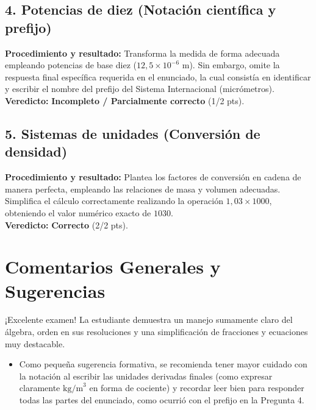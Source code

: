 \documentclass[12pt]{article}
\begin{document}
\subsection*{4. Potencias de diez (Notación científica y prefijo)}
\textbf{Procedimiento y resultado:} Transforma la medida de forma adecuada empleando potencias de base diez ($12,5 \times 10^{-6}$ m). Sin embargo, omite la respuesta final específica requerida en el enunciado, la cual consistía en identificar y escribir el nombre del prefijo del Sistema Internacional (micrómetros). \\
\textbf{Veredicto:} \textbf{Incompleto / Parcialmente correcto} (1/2 pts).

\subsection*{5. Sistemas de unidades (Conversión de densidad)}
\textbf{Procedimiento y resultado:} Plantea los factores de conversión en cadena de manera perfecta, empleando las relaciones de masa y volumen adecuadas. Simplifica el cálculo correctamente realizando la operación $1,03 \times 1000$, obteniendo el valor numérico exacto de $1030$. \\
\textbf{Veredicto:} \textbf{Correcto} (2/2 pts).

\vspace{0.5cm}
\section*{Comentarios Generales y Sugerencias}
¡Excelente examen! La estudiante demuestra un manejo sumamente claro del álgebra, orden en sus resoluciones y una simplificación de fracciones y ecuaciones muy destacable. 
\begin{itemize}
    \item Como pequeña sugerencia formativa, se recomienda tener mayor cuidado con la notación al escribir las unidades derivadas finales (como expresar claramente $\text{kg/m}^3$ en forma de cociente) y recordar leer bien para responder todas las partes del enunciado, como ocurrió con el prefijo en la Pregunta 4.
\end{itemize}
\end{document}
